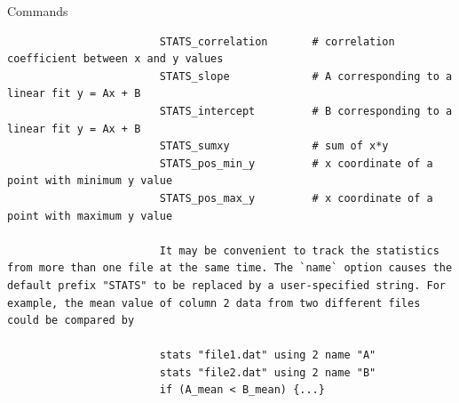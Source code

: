 \documentclass{beamer}
\begin{document}
\begin{frame}{Commands}
\begin{enumerate}
\begin{verbatim}
						STATS_correlation       # correlation coefficient between x and y values
						STATS_slope             # A corresponding to a linear fit y = Ax + B
						STATS_intercept         # B corresponding to a linear fit y = Ax + B
						STATS_sumxy             # sum of x*y
						STATS_pos_min_y         # x coordinate of a point with minimum y value
						STATS_pos_max_y         # x coordinate of a point with maximum y value
										     
						It may be convenient to track the statistics from more than one file at the same time. The `name` option causes the default prefix "STATS" to be replaced by a user-specified string. For example, the mean value of column 2 data from two different files could be compared by
										
						stats "file1.dat" using 2 name "A"
						stats "file2.dat" using 2 name "B"
						if (A_mean < B_mean) {...}
					\end{verbatim}
								
			\end{enumerate}				
		\end{frame}
\end{document}
